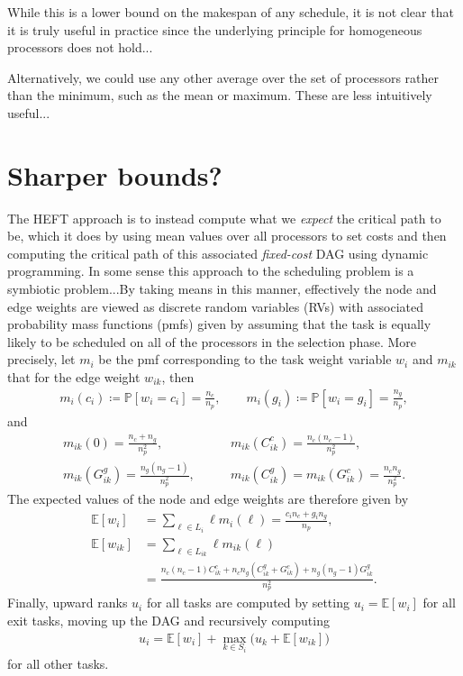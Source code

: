 \documentclass[12pt]{article}
\def\P{\mathbb{P}}
\def\E{\mathbb{E}}
\begin{document}
While this is a lower bound on the makespan of any schedule, it is not clear that it is truly useful in practice since the underlying principle for homogeneous processors does not hold...   

Alternatively, we could use any other average over the set of processors rather than the minimum, such as the mean or maximum. These are less intuitively useful...


\section{Sharper bounds?}
\label{sect.fulkerson}

The HEFT approach is to instead compute what we {\em expect} the critical path to be, which it does by using mean values over all processors to set costs and then computing the critical path of this associated {\em fixed-cost} DAG using dynamic programming. In some sense this approach to the scheduling problem is a symbiotic problem...By taking means in this manner, effectively the node and edge weights are viewed as discrete random variables (RVs) with associated probability mass functions (pmfs) given by assuming that the task is equally likely to be scheduled on all of the processors in the selection phase. More precisely, let $m_i$ be the pmf corresponding to the task weight variable $w_i$ and $m_{ik}$ that for the edge weight $w_{ik}$, then  
\begin{align*}
m_i(c_i) \coloneqq \P[w_i = c_i] = \frac{n_c}{n_p}, \qquad m_i(g_i) \coloneqq \P[w_i = g_i] = \frac{n_g}{n_p},
\end{align*}
and   
\begin{align*}
m_{ik}(0) = \frac{n_c + n_g}{n_p^2}, &\qquad m_{ik}(C_{ik}^c) = \frac{n_c(n_c - 1)}{n_p^2}, \\
m_{ik} (G_{ik}^g) = \frac{n_g(n_g - 1)}{n_p^2}, &\qquad m_{ik}(C_{ik}^g) = m_{ik}(G_{ik}^c) = \frac{n_cn_g}{n_p^2}.
\end{align*}
The expected values of the node and edge weights are therefore given by
\begin{align}
\E[w_i] &= \sum_{\ell \in L_i} \ell m_i(\ell) = \frac{c_in_c + g_in_g}{n_p}, \label{eq.expected_node}\\
\E[w_{ik}] &= \sum_{\ell \in L_{ik}} \ell m_{ik}(\ell) \nonumber\\
&= \frac{n_c(n_c - 1)C_{ik}^c + n_cn_g(C_{ik}^g + G_{ik}^c) + n_g(n_g - 1) G_{ik}^g }{n_p^2} \label{eq.expected_edge}.
\end{align}
Finally, upward ranks $u_i$ for all tasks are computed by setting $u_i = \E[w_i]$ for all exit tasks, moving up the DAG and recursively computing
\begin{align}
u_i = \E[w_i] + \max_{k \in S_i} \big( u_k + \E[w_{ik}] \big) \label{eq.ur_expectation}
\end{align}
for all other tasks.
\end{document}
